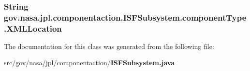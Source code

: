 \subsubsection[{X\+M\+L\+Location}]{\setlength{\rightskip}{0pt plus 5cm}String gov.\+nasa.\+jpl.\+componentaction.\+I\+S\+F\+Subsystem.\+component\+Type.\+X\+M\+L\+Location\hspace{0.3cm}{\ttfamily [package]}}\label{classgov_1_1nasa_1_1jpl_1_1componentaction_1_1_i_s_f_subsystem_1_1component_type_ac545f9b7365e3bb8c9d823be84395f37}


The documentation for this class was generated from the following file\+:\begin{DoxyCompactItemize}
\item 
src/gov/nasa/jpl/componentaction/{\bf I\+S\+F\+Subsystem.\+java}\end{DoxyCompactItemize}
